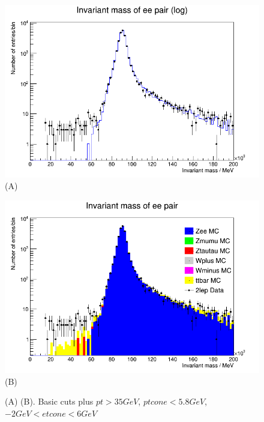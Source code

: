 \begin{figure}[h!]
    \centering
    \begin{minipage}{0.5\textwidth}
        \centering
        \includegraphics[width=\linewidth]{plots/02-03-2021/10-23_2Stack.png}
        (A)
    \end{minipage}\hfill
    \begin{minipage}{0.5\textwidth}
        \centering
        \includegraphics[width=\linewidth]{plots/02-03-2021/10-27_AllStack.png}
        (B)
    \end{minipage}
    \caption{(A)  (B). Basic cuts plus $pt > 35 GeV $, $ptcone < 5.8 GeV$, $-2 GeV < etcone < 6 GeV $}
    \label{fig:10:10_02-03-21}
\end{figure}


